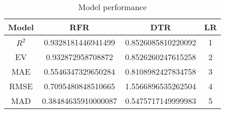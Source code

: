 \begin{table}[!ht]
    \centering
    \begin{adjustbox}{width=.7\textwidth}
    \footnotesize
    \begin{tabular}{cccc}
    \hline
    Model & RFR & DTR & LR\\
    \hline
    $R^2$ & 0.9328181446941499    &0.8526085810220092&1\\
    EV &   0.932872958708872  &0.8526260247615258 &2 \\
    MAE &0.5546347329650284 &0.8108982427834758 &3\\
    RMSE  &0.7095480848510665 &1.5566896535262504&4\\
    MAD    &0.38484635910000087 & 0.5475717149999983&5\\
    \hline
\end{tabular}
\end{adjustbox}
\caption{Model performance}\label{table2}
\end{table}